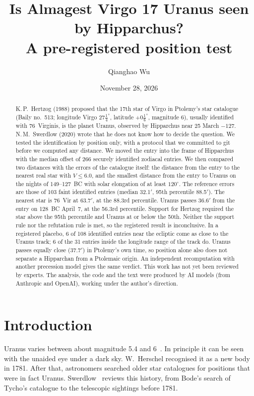 \documentclass[11pt]{article}
\title{Is Almagest Virgo 17 Uranus seen by Hipparchus?\\A pre-registered position test}
\author{Qianghao Wu}
\date{November 28, 2026}
\newcommand{\am}{$'$}
\begin{document}
\sloppy
\maketitle

\begin{abstract}
K.\,P.~Hertzog (1988) proposed that the 17th star of Virgo in Ptolemy's star catalogue (Baily no.~513; longitude Virgo $27\tfrac14^\circ$, latitude $+0\tfrac16^\circ$, magnitude 6), usually identified with 76~Virginis, is the planet Uranus, observed by Hipparchus near 25 March $-127$. N.\,M.~Swerdlow (2020) wrote that he does not know how to decide the question. We tested the identification by position only, with a protocol that we committed to git before we computed any distance. We moved the entry into the frame of Hipparchus with the median offset of 266 securely identified zodiacal entries. We then compared two distances with the errors of the catalogue itself: the distance from the entry to the nearest real star with $V\le6.0$, and the smallest distance from the entry to Uranus on the nights of 149--127~BC with solar elongation of at least $120^\circ$. The reference errors are those of 103 faint identified entries (median 32.1\am, 95th percentile 88.5\am). The nearest star is 76~Vir at 63.7\am, at the 88.3rd percentile. Uranus passes 36.6\am{} from the entry on 128~BC April~7, at the 56.3rd percentile. Support for Hertzog required the star above the 95th percentile and Uranus at or below the 50th. Neither the support rule nor the refutation rule is met, so the registered result is inconclusive. In a registered placebo, 6 of 108 identified entries near the ecliptic come as close to the Uranus track; 6 of the 31 entries inside the longitude range of the track do. Uranus passes equally close (37.7\am) in Ptolemy's own time, so position alone also does not separate a Hipparchan from a Ptolemaic origin. An independent recomputation with another precession model gives the same verdict.
This work has not yet been reviewed by experts. The analysis, the code and the text were produced by AI models (from Anthropic and OpenAI), working under the author's direction.
\end{abstract}

\section{Introduction}
Uranus varies between about magnitude 5.4 and 6~\cite{swerdlow2020}. In principle it can be seen with the unaided eye under a dark sky. W.~Herschel recognised it as a new body in 1781. After that, astronomers searched older star catalogues for positions that were in fact Uranus. Swerdlow~\cite{swerdlow2020} reviews this history, from Bode's search of Tycho's catalogue to the telescopic sightings before 1781.
\end{document}
